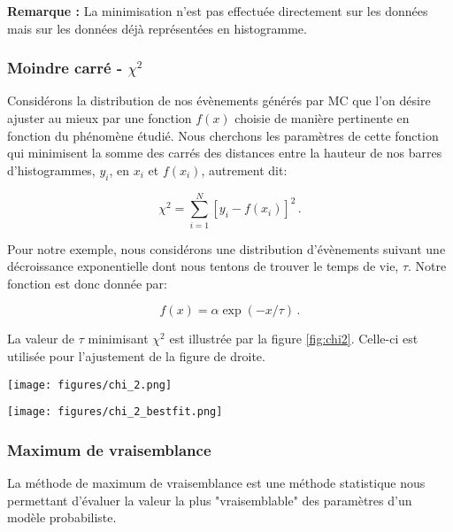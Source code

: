 \textbf{Remarque :} La minimisation n'est pas effectuée directement sur les données mais sur les données déjà représentées en histogramme.

\subsubsection{Moindre carré - $\chi^{2}$}
Considérons la distribution de nos évènements générés par MC  que l'on désire ajuster au mieux par une fonction $f(x)$ choisie de manière pertinente en fonction du phénomène étudié. Nous cherchons les paramètres de cette fonction qui minimisent la somme des carrés des distances entre la hauteur de nos barres d'histogrammes, $y_i$, en $x_i$ et $f(x_i)$, autrement dit:

\begin{equation}
\chi^2 = \sum_{i=1}^{N} \left[ y_i - f(x_i) \right]^2 \, .
\end{equation}

Pour notre exemple, nous considérons une distribution d'évènements suivant une décroissance exponentielle dont nous tentons de trouver le temps de vie, $\tau$. Notre fonction est donc donnée par:

\begin{equation}
f(x) = \alpha \exp(-x / \tau) \, .
\end{equation}

La valeur de $\tau$ minimisant $\chi^2$ est illustrée par la figure \ref{fig:chi2}. Celle-ci est utilisée pour l'ajustement de la figure de droite.

\begin{figure*}[h!]
    \centering
    \begin{minipage}[b]{0.48\linewidth}
    \texttt{[image: figures/chi\_2.png]}
    \end{minipage}
    \hfill
    \begin{minipage}[b]{0.51\linewidth}
    \texttt{[image: figures/chi\_2\_bestfit.png]}
    \end{minipage}
    \caption{\textbf{Gauche :} La valeur de $\tau$ minimisant $\chi^2$ est désignée par le point orange. \textbf{Droite :} Le fit obtenu à partir de $\tau_{best}$ (orange) est mis en graphique au côté de la distribution des données MC que nous tentions d'ajuster.}
    \label{fig:chi2}
\end{figure*}

\subsubsection{Maximum de vraisemblance}
La méthode de maximum de vraisemblance est une méthode statistique nous permettant d'évaluer la valeur la plus "vraisemblable" des paramètres d'un modèle probabiliste. 

